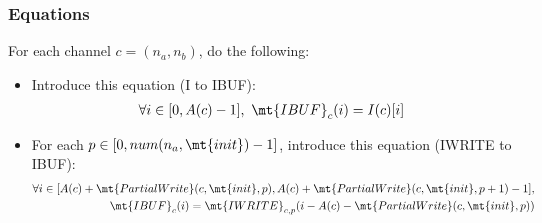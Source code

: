 \subsubsection{Equations}

For each channel $c = (n_a, n_b)$, do the following:

\begin{itemize}

\item Introduce this equation (I to IBUF):
\begin{align*}
\forall i \in [0,A(c)-1],~\mt{IBUF}_{c}(i) = I(c)[i] \\
\end{align*}

\item For each $p \in [0, num(n_a, \mt{init})-1]$, introduce this
equation (IWRITE to IBUF):
\begin{align*}
\forall i \in [A(c) + \mt{PartialWrite}(c,\mt{init},p), 
               A(c) + \mt{PartialWrite}(c,\mt{init},p+1)-1], \\
\mt{IBUF}_{c}(i) = \mt{IWRITE}_{c, p}(i - A(c) - \mt{PartialWrite}(c,\mt{init},p)) \\
\end{align*}

\end{itemize}

